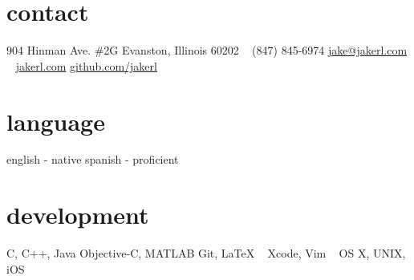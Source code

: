 \documentclass[print]{friggeri-cv}
\begin{document}

\begin{aside}
\section{contact}
904 Hinman Ave. \#2G
Evanston, Illinois 60202
~
(847) 845-6974
\href{mailto:jake@jakerl.com}{jake@jakerl.com}
~
\href{http://www.jakerl.com}{jakerl.com}
\href{https://github.com/jakerl}{github.com/jakerl}
\section{language}
english - native
spanish - proficient
\section{development}
C, C++, Java
Objective-C, MATLAB
Git, \LaTeX
~
Xcode, Vim
~
OS X, UNIX, iOS

\end{aside}
\end{document}
